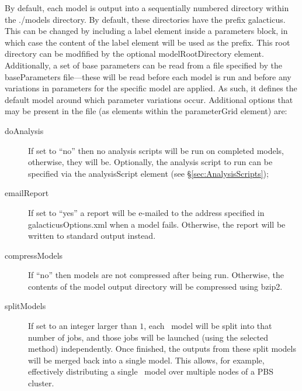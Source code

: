 By default, each model is output into a sequentially numbered directory within the {\normalfont \ttfamily ./models} directory. By default, these directories have the prefix {\normalfont \ttfamily galacticus}. This can be changed by including a {\normalfont \ttfamily label} element inside a {\normalfont \ttfamily parameters} block, in which case the content of the {\normalfont \ttfamily label} element will be used as the prefix. This root directory can be modfified by the optional {\normalfont \ttfamily modelRootDirectory} element. Additionally, a set of base parameters can be read from a file specified by the {\normalfont \ttfamily baseParameters} file---these will be read before each model is run and before any variations in parameters for the specific model are applied. As such, it defines the default model around which parameter variations occur. Additional options that may be present in the file (as elements within the {\normalfont \ttfamily parameterGrid} element) are:
\begin{description}
\item[{\normalfont \ttfamily doAnalysis}]If set to ``no'' then no analysis scripts will be run on completed models, otherwise, they will be. Optionally, the analysis script to run can be specified via the {\normalfont \ttfamily analysisScript} element (see \S\ref{sec:AnalysisScripts});
\item[{\normalfont \ttfamily emailReport}] If set to ``yes'' a report will be e-mailed to the address specified in {\normalfont \ttfamily galacticusOptions.xml} when a model fails. Otherwise, the report will be written to standard output instead.
\item[{\normalfont \ttfamily compressModels}] If ``no'' then models are not compressed after being run. Otherwise, the contents of the model output directory will be compressed using {\normalfont \ttfamily bzip2}.
\item[{\normalfont \ttfamily splitModels}] If set to an integer larger than $1$, each \glc\ model will be split into that number of jobs, and those jobs will be launched (using the selected method) independently. Once finished, the outputs from these split models will be merged back into a single model. This allows, for example, effectively distributing a single \glc\ model over multiple nodes of a PBS cluster.
\end{description}

